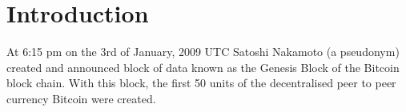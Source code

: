\section{Introduction}
%
%



% 
% 
% 
% 

At 6:15 pm on the 3rd of January, 2009 UTC Satoshi Nakamoto (a pseudonym)
created and announced block of data known as the Genesis Block of the Bitcoin
block chain\cite{satoshi}. With this block, the first 50 units of the
decentralised peer to peer currency Bitcoin were created.

